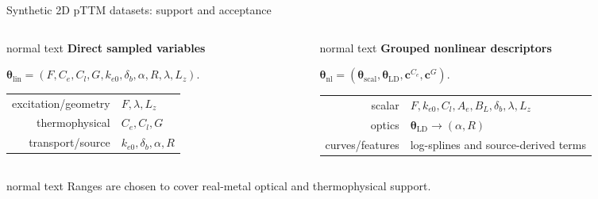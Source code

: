 \documentclass[aspectratio=169,10pt]{beamer}
\begin{document}
\begin{frame}[t]{Synthetic 2D pTTM datasets: support and acceptance}
  \vspace{0.12cm}
  \begin{columns}[T,totalwidth=0.96\textwidth]
    \begin{column}{0.47\textwidth}
      \begin{beamercolorbox}[wd=\linewidth,sep=0.52em]{normal text}
        \scriptsize
        \textbf{\color{GVTeal}Direct sampled variables}\par
        \vspace{0.08cm}
        \(
          \boldsymbol\theta_{\mathrm{lin}}
          =
          (F,C_e,C_l,G,k_{e0},\delta_b,\alpha,R,\lambda,L_z)
        \).\par
        \vspace{0.13cm}
        \begin{tabular}{@{}r@{\;: }l@{}}
          excitation/geometry & \(F,\lambda,L_z\) \\
          thermophysical & \(C_e,C_l,G\) \\
          transport/source & \(k_{e0},\delta_b,\alpha,R\)
        \end{tabular}
      \end{beamercolorbox}
    \end{column}
    \begin{column}{0.47\textwidth}
      \begin{beamercolorbox}[wd=\linewidth,sep=0.52em]{normal text}
        \scriptsize
        \textbf{\color{GVDiffusionGreen}Grouped nonlinear descriptors}\par
        \vspace{0.08cm}
        \(
          \boldsymbol\theta_{\mathrm{nl}}
          =
          (\boldsymbol\theta_{\mathrm{scal}},
          \boldsymbol\theta_{\mathrm{LD}},
          \mathbf c^{C_e},\mathbf c^G)
        \).\par
        \vspace{0.13cm}
        \begin{tabular}{@{}r@{\;: }l@{}}
          scalar & \(F,k_{e0},C_l,A_e,B_L,\delta_b,\lambda,L_z\) \\
          optics & \(\boldsymbol\theta_{\mathrm{LD}}\rightarrow(\alpha,R)\) \\
          curves/features & log-splines and source-derived terms
        \end{tabular}
      \end{beamercolorbox}
    \end{column}
  \end{columns}

  \vspace{0.08cm}
  \begin{center}
    \begin{beamercolorbox}[wd=0.91\textwidth,sep=0.40em,center]{normal text}
      \small\color{GVSlate}
      Ranges are chosen to cover real-metal optical and thermophysical support.
    \end{beamercolorbox}
  \end{center}
\end{frame}
\end{document}
